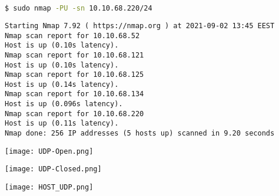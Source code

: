 \documentclass[11pt]{article}
\newenvironment{commandbox}[1][]{
  \begin{tcolorbox}[
      colback=kalibackground,
      colframe=commandcolor,
      fonttitle=\bfseries\color{white},
      title=#1,
      breakable=true
    ]
  }{
  \end{tcolorbox}
}
\begin{document}
\begin{commandbox}[UDP Scan (-PU)]
\begin{lstlisting}[language=bash, style=bash, basicstyle=\small\ttfamily\color{warningcolor}]
$ sudo nmap -PU -sn 10.10.68.220/24
\end{lstlisting}

\begin{lstlisting}[basicstyle=\small\ttfamily\color{kalitext}]
Starting Nmap 7.92 ( https://nmap.org ) at 2021-09-02 13:45 EEST
Nmap scan report for 10.10.68.52
Host is up (0.10s latency).
Nmap scan report for 10.10.68.121
Host is up (0.10s latency).
Nmap scan report for 10.10.68.125
Host is up (0.14s latency).
Nmap scan report for 10.10.68.134
Host is up (0.096s latency).
Nmap scan report for 10.10.68.220
Host is up (0.11s latency).
Nmap done: 256 IP addresses (5 hosts up) scanned in 9.20 seconds
\end{lstlisting}
\end{commandbox}
\begin{center}
  \texttt{[image: UDP-Open.png]}
\end{center}
\begin{center}
  \texttt{[image: UDP-Closed.png]}
\end{center}
\begin{center}
  \texttt{[image: HOST\_UDP.png]}
\end{center}
\end{document}
